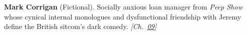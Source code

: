 \textbf{Mark Corrigan} (Fictional). Socially anxious loan manager from \emph{Peep Show} whose cynical internal monologues and dysfunctional friendship with Jeremy define the British sitcom's dark comedy. \emph{[Ch.~\hyperref[ch:arrowtheoremtopology]{09}]}

